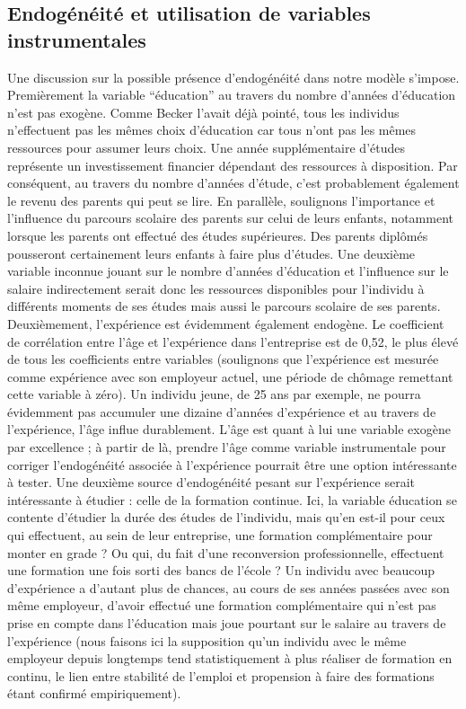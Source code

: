 \documentclass[a4paper, french, 11 pt]{article}\usepackage[]{graphicx}\usepackage[]{xcolor}
\begin{document}
\subsection{Endogénéité et utilisation de variables instrumentales}

        Une discussion sur la possible présence d’endogénéité dans notre modèle s’impose. Premièrement la variable “éducation” au travers du nombre d’années d’éducation n’est pas exogène. Comme Becker l’avait déjà pointé, tous les individus n’effectuent pas les mêmes choix d’éducation car tous n’ont pas les mêmes ressources pour assumer leurs choix. Une année supplémentaire d’études représente un investissement financier dépendant des ressources à disposition. Par conséquent, au travers du nombre d’années d’étude, c’est probablement également le revenu des parents qui peut se lire. En parallèle, soulignons l’importance et l’influence du parcours scolaire des parents sur celui de leurs enfants, notamment lorsque les parents ont effectué des études supérieures. Des parents diplômés pousseront certainement leurs enfants à faire plus d’études. Une deuxième variable inconnue jouant sur le nombre d’années d’éducation et l’influence sur le salaire indirectement serait donc les ressources disponibles pour l’individu à différents moments de ses études mais aussi le parcours scolaire de ses parents.
        Deuxièmement, l’expérience est évidemment également endogène. Le coefficient de corrélation entre l’âge et l’expérience dans l’entreprise est de 0,52, le plus élevé de tous les coefficients entre variables (soulignons que l’expérience est mesurée comme expérience avec son employeur actuel, une période de chômage remettant cette variable à zéro). Un individu jeune, de 25 ans par exemple, ne pourra évidemment pas accumuler une dizaine d’années d’expérience et au travers de l’expérience, l’âge influe durablement. L’âge est quant à lui une variable exogène par excellence ; à partir de là, prendre l’âge comme variable instrumentale pour corriger l’endogénéité associée à l’expérience pourrait être une option intéressante à tester. Une deuxième source d’endogénéité pesant sur l’expérience serait intéressante à étudier : celle de la formation continue. Ici, la variable éducation se contente d’étudier la durée des études de l’individu, mais qu’en est-il pour ceux qui effectuent, au sein de leur entreprise, une formation complémentaire pour monter en grade ? Ou qui, du fait d’une reconversion professionnelle, effectuent une formation une fois sorti des bancs de l’école ? Un individu avec beaucoup d’expérience a d’autant plus de chances, au cours de ses années passées avec son même employeur, d’avoir effectué une formation complémentaire qui n’est pas prise en compte dans l’éducation mais joue pourtant sur le salaire au travers de l’expérience (nous faisons ici la supposition qu’un individu avec le même employeur depuis longtemps tend statistiquement à plus réaliser de formation en continu, le lien entre stabilité de l’emploi et propension à faire des formations étant confirmé empiriquement).
\end{document}
